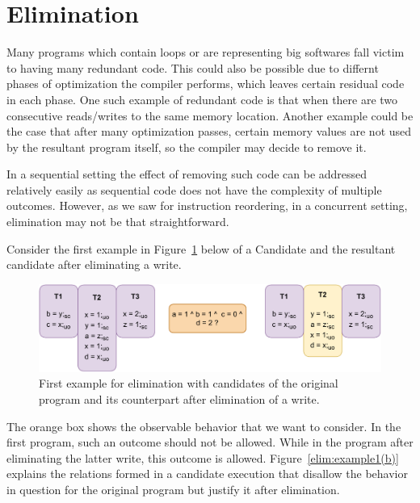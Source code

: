 \section{Elimination}

    Many programs which contain loops or are representing big softwares fall victim to having many redundant code. 
    This could also be possible due to differnt phases of optimization the compiler performs, which leaves certain residual code in each phase.
    One such example of redundant code is that when there are two consecutive reads/writes to the same memory location.
    Another example could be the case that after many optimization passes, certain memory values are not used by the resultant program itself, so the compiler may decide to remove it.
    

    In a sequential setting the effect of removing such code can be addressed relatively easily as sequential code does not have the complexity of multiple outcomes.
    However, as we saw for instruction reordering, in a concurrent setting, elimination may not be that straightforward. 
    
    Consider the first example in Figure~\ref{elim:example1(a)} below of a Candidate and the resultant candidate after eliminating a write.
    \begin{figure}[H]
        \centering
        \includegraphics[scale=0.7]{6.Elimination/EliminationExample1(a).pdf}
        \caption{First example for elimination with candidates of the original program and its counterpart after elimination of a write.} 
        \label{elim:example1(a)}
    \end{figure}

    The orange box shows the observable behavior that we want to consider. 
    In the first program, such an outcome should not be allowed. 
    While in the program after eliminating the latter write, this outcome is allowed.
    Figure~\ref{elim:example1(b)} explains the relations formed in a candidate execution that disallow the behavior in question for the original program but justify it after elimination. 
    
